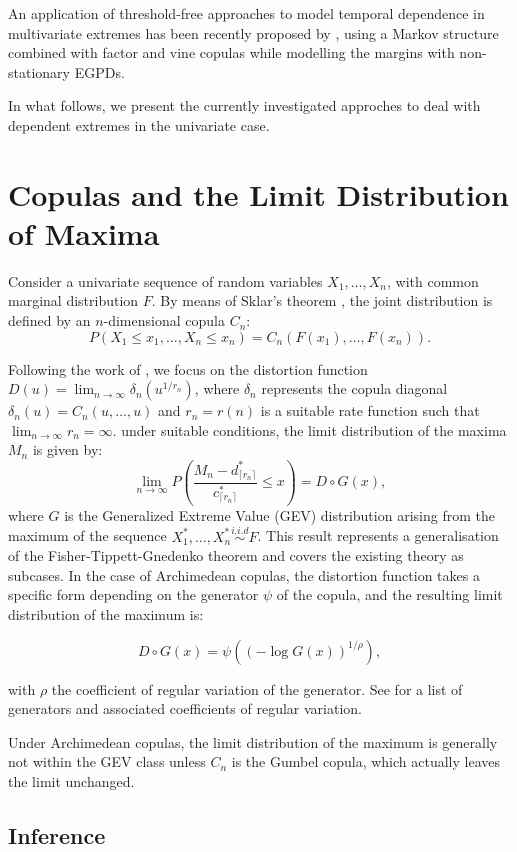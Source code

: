 \documentclass[11pt, a4paper]{article}
\begin{document}
An application of threshold-free approaches to model temporal dependence in multivariate extremes has been recently proposed by \textcite{li2026}, using a Markov structure combined with factor and vine copulas while modelling the margins with non-stationary EGPDs.

In what follows, we present the currently investigated approches to deal with dependent extremes in the univariate case.

\section{Copulas and the Limit Distribution of Maxima}
Consider a univariate sequence of random variables $X_1, \dots, X_n$, with common marginal distribution $F$. By means of Sklar's theorem \parencite{sklar1959}, the joint distribution is defined by an $n$-dimensional copula $C_n$:
\[
P(X_1 \leq x_1, \dots, X_n \leq x_n) = C_n(F(x_1), \dots, F(x_n)).
\]

Following the work of \textcite{herrmann2024}, we focus on the distortion function $D(u) = \lim_{n \to \infty} \delta_n(u^{1/r_n})$, where $\delta_n$ represents the copula diagonal $\delta_n(u) = C_n(u, \dots, u)$ and $r_n = r(n)$ is a suitable rate function such that $\lim_{n \to \infty} r_n = \infty$. under suitable conditions, the limit distribution of the maxima $M_n$ is given by:
\[
\lim_{n \to \infty} P \left(\frac{M_n - d^*_{\lceil{r_n}\rceil}}{c^*_{\lceil{r_n}\rceil}} \leq x \right) = D \circ G(x),
\]
where $G$ is the Generalized Extreme Value (GEV) distribution arising from the maximum of the sequence $X_1^*, \dots, X_n^* \overset{i.i.d}{\sim} F$. This result represents a generalisation of the Fisher-Tippett-Gnedenko theorem and covers the existing theory as subcases. In the case of Archimedean copulas, the distortion function takes a specific form depending on the generator $\psi$ of the copula, and the resulting limit distribution of the maximum is:

\[
D \circ G(x) = \psi((- \log G(x))^{1/\rho}),
\]

with $\rho$ the coefficient of regular variation of the generator. See \textcite[Table 1]{herrmann2024} for a list of generators and associated coefficients of regular variation.

Under Archimedean copulas, the limit distribution of the maximum is generally not within the GEV class unless $C_n$ is the Gumbel copula, which actually leaves the limit unchanged.


\subsection{Inference}
\end{document}
